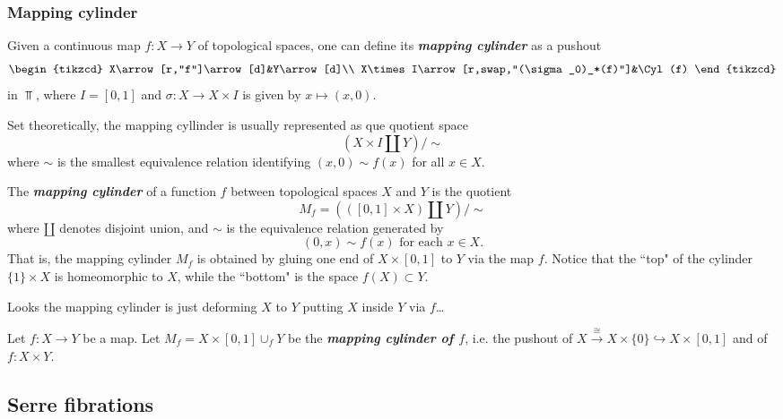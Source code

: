 \begin{remark}
\subsubsection{Mapping cylinder}

\begin{definition}
	Given a continuous map $f:X\to Y$ of topological spaces, one can define its \textbf{\textit{mapping cylinder}} as a pushout
	\[\begin{tikzcd}
		X\arrow[r,"f"]\arrow[d]&Y\arrow[d]\\
		X\times I\arrow[r,swap,"(\sigma_0)_*(f)"]&\Cyl(f)
	\end{tikzcd}\]
	in $\Top$, where $I=[0,1]$ and $\sigma:X\to X\times I$ is given by $x\mapsto(x,0)$.
	
	Set theoretically, the mapping cyllinder is usually represented as que quotient space
	\[\left(X\times I\coprod Y\right)\Big/\sim\]
	where $\sim$ is the smallest equivalence relation identifying $(x,0)\sim f(x)$ for all $x\in X$.
\end{definition}

\begin{definition}
	The \textbf{\textit{mapping cylinder}} of a function $f$ between topological spaces $X$ and $Y$ is the quotient
	\[M_f=(([0,1]\times X)\amalg Y)\big/\sim\]
	where $\amalg$ denotes disjoint union, and $\sim$ is the equivalence relation generated by
	\[(0,x)\sim f(x)\text{ for each }x\in X.\]
	{\color{persiangreen}That is, the mapping cylinder $M_f$ is obtained by gluing one end of $X\times[0,1]$ to $Y$ via the map $f$.} Notice that the ``top" of the cylinder $\{1\}\times X$ is homeomorphic to $X$, while the ``bottom" is the space $f(X)\subset Y$.
	
{\color{persiangreen}Looks the mapping cylinder is just deforming $X$ to $Y$ putting $X$ inside $Y$ via $f$…}
\end{definition}

\begin{definition}
	Let $f:X\to Y$ be a map. Let $M_f=X\times[0,1]\cup_fY$ be the \textbf{\textit{mapping cylinder of $f$}}, i.e. the pushout of $X\overset{\cong}{\to}X\times\{0\}\hookrightarrow X\times[0,1]$ and of $f:X\times Y$.
\end{definition}

\subsection{Serre fibrations}


\end{remark}
